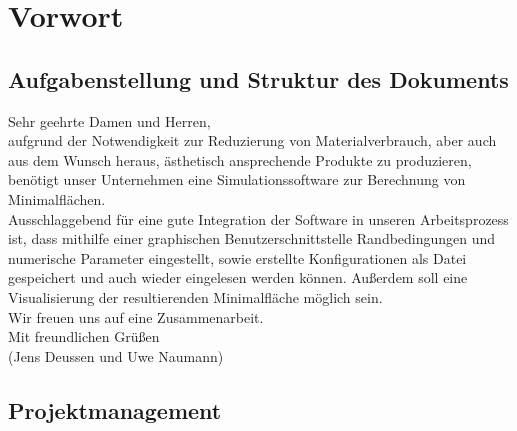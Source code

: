 \chapter{Vorwort}
\label{ch:1}

\section{Aufgabenstellung und Struktur des Dokuments}
\label{sec:1.1}

Sehr geehrte Damen und Herren, \\

\noindent aufgrund der Notwendigkeit zur Reduzierung von Materialverbrauch, aber auch aus dem Wunsch heraus, \"asthetisch ansprechende Produkte zu produzieren, ben\"otigt unser Unternehmen eine Simulationssoftware zur Berechnung von Minimalfl\"achen. \\ 

\noindent Ausschlaggebend f\"ur eine gute Integration der Software in unseren Arbeitsprozess ist, dass mithilfe einer graphischen Benutzerschnittstelle Randbedingungen und numerische Parameter eingestellt, sowie erstellte Konfigurationen als Datei gespeichert und auch wieder eingelesen werden k\"onnen. Au\ss erdem soll eine Visualisierung der resultierenden Minimalfl\"ache m\"oglich sein. \\

\noindent Wir freuen uns auf eine Zusammenarbeit.\\
Mit freundlichen Gr\"u\ss en \\

\noindent (Jens Deussen und Uwe Naumann)

\section{Projektmanagement}
\label{sec:1.2}

